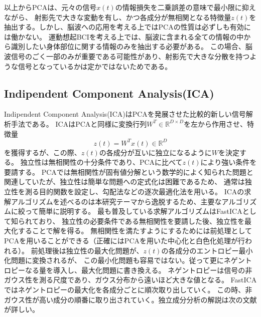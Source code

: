 以上からPCAは、元々の信号\(x(t)\)の情報損失を二乗誤差の意味で最小限に抑えながら、
射影先で大きな変動を有し、かつ各成分が無相関となる特徴量\(z(t)\)を抽出する。しかし、脳波への応用を考える上ではPCAの性質は必ずしも有効には働かない。
運動想起BCIを考える上では、脳波に含まれる全ての情報の中から識別したい身体部位に関する情報のみを抽出する必要がある。
この場合、脳波信号のごく一部のみが重要である可能性があり、射影先で大きな分散を持つような信号となっているかは定かではないためである。




\subsection{\rm Indipendent Component Analysis(ICA)}
Indipendent Component Analysis(ICA)はPCAを発展させた比較的新しい信号解析手法である。
ICAはPCAと同様に変換行列\(W^T \in \mathbb R^{D \times D}\)を左から作用させ、特徴量
\begin{equation}
    z(t)=W^Tx(t) \in \mathbb R^D
\end{equation}
を獲得するが、この際、\(z(t)\)の各成分が互いに独立になるように\(W\)を決定する。
独立性は無相関性の十分条件であり、PCAに比べて\(z(t)\)により強い条件を要請する。
PCAでは無相関性が固有値分解という数学的によく知られた問題と関連していたが、独立性は簡単な問題への定式化は困難であるため、
通常は独立性を測る目的関数を設定し、勾配法などの逐次最適化法を用いる。
ICAの求解アルゴリズムを述べるのは本研究テーマから逸脱するため、主要なアルゴリズムに絞って簡単に説明する。
最も普及している求解アルゴリズムはFastICAとして知られており、
独立性の必要条件である無相関性を要請した後、独立性を最大化することで解を得る。
無相関性を満たすようにするためには前処理としてPCAを用いることができる（正確にはPCAを用いた中心化と白色化処理が行われる）。
前処理後は独立性の最大化問題が、\(z(t)\)の各成分のエントロピー最小化問題に変換されるが、
この最小化問題も容易ではない。従って更にネゲントロピーなる量を導入し、最大化問題に書き換える。
ネゲントロピーは信号の非ガウス性を測る尺度であり、ガウス分布から遠いほど大きな値となる。
FastICAではネゲントロピーの最大化を各成分ごとに順次取り出していく。
この時、非ガウス性が高い成分の順番に取り出されていく。独立成分分析の解説は次の文献が詳しい\cite{ICA1}\cite{ICA2}。

